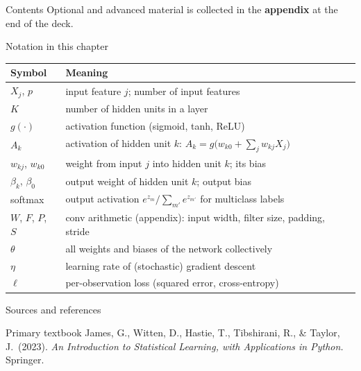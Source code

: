 \documentclass[aspectratio=169,11pt]{beamer}
\begin{document}
\begin{frame}{Contents}\footnotesize\tableofcontents[hideallsubsections]
  \vfill
  {\tiny Optional and advanced material is collected in the \textbf{appendix} at the end of the deck.}
\end{frame}

\begin{frame}{Notation in this chapter}
  \footnotesize
  \begin{center}
  \begin{tabular}{@{}ll@{}}
    \toprule
    \textbf{Symbol} & \textbf{Meaning} \\
    \midrule
    $X_j$, $p$ & input feature $j$; number of input features \\
    $K$ & number of hidden units in a layer \\
    $g(\cdot)$ & activation function (sigmoid, tanh, ReLU) \\
    $A_k$ & activation of hidden unit $k$: $A_k=g\big(w_{k0}+\sum_j w_{kj}X_j\big)$ \\
    $w_{kj}$, $w_{k0}$ & weight from input $j$ into hidden unit $k$; its bias \\
    $\beta_k$, $\beta_0$ & output weight of hidden unit $k$; output bias \\
    softmax & output activation $e^{z_m}/\sum_{m'} e^{z_{m'}}$ for multiclass labels \\
    $W$, $F$, $P$, $S$ & conv arithmetic (appendix): input width, filter size, padding, stride \\
    $\theta$ & all weights and biases of the network collectively \\
    $\eta$ & learning rate of (stochastic) gradient descent \\
    $\ell$ & per-observation loss (squared error, cross-entropy) \\
    \bottomrule
  \end{tabular}
  \end{center}
\end{frame}

\begin{frame}{Sources and references}
  \begin{block}{Primary textbook}
    James, G., Witten, D., Hastie, T., Tibshirani, R., \& Taylor, J.\ (2023).
    \emph{An Introduction to Statistical Learning, with Applications in
    Python.} Springer.
  \end{block}
\end{frame}
\end{document}
